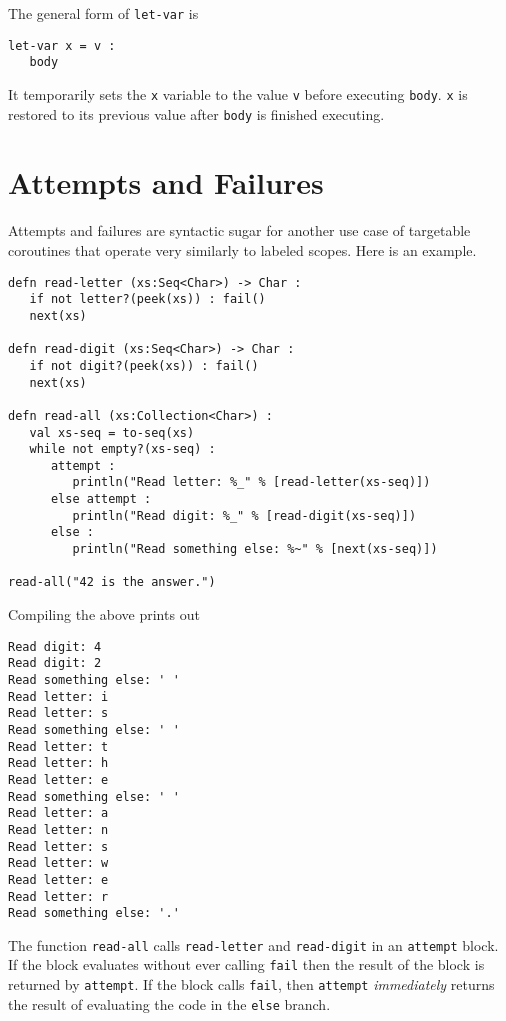\documentclass[10pt,oneside]{book}
\begin{document}
The general form of \texttt{\frenchspacing let-var} is
\begin{lstlisting}
let-var x = v :
   body
\end{lstlisting}
It temporarily sets the \texttt{\frenchspacing x} variable to the value \texttt{\frenchspacing v} before executing \texttt{\frenchspacing body}. \texttt{\frenchspacing x} is restored to its previous value after \texttt{\frenchspacing body} is finished executing.

\section{Attempts and Failures}
Attempts and failures are syntactic sugar for another use case of targetable coroutines that operate very similarly to labeled scopes. Here is an example.
\begin{lstlisting}
defn read-letter (xs:Seq<Char>) -> Char :
   if not letter?(peek(xs)) : fail()
   next(xs)

defn read-digit (xs:Seq<Char>) -> Char :
   if not digit?(peek(xs)) : fail()
   next(xs)

defn read-all (xs:Collection<Char>) :
   val xs-seq = to-seq(xs)
   while not empty?(xs-seq) :
      attempt : 
         println("Read letter: %_" % [read-letter(xs-seq)])
      else attempt :
         println("Read digit: %_" % [read-digit(xs-seq)])
      else :
         println("Read something else: %~" % [next(xs-seq)])

read-all("42 is the answer.")         
\end{lstlisting}
Compiling the above prints out
\begin{lstlisting}
Read digit: 4
Read digit: 2
Read something else: ' '
Read letter: i
Read letter: s
Read something else: ' '
Read letter: t
Read letter: h
Read letter: e
Read something else: ' '
Read letter: a
Read letter: n
Read letter: s
Read letter: w
Read letter: e
Read letter: r
Read something else: '.'
\end{lstlisting}
The function \texttt{\frenchspacing read-all} calls \texttt{\frenchspacing read-letter} and \texttt{\frenchspacing read-digit} in an \texttt{\frenchspacing attempt} block. If the block evaluates without ever calling \texttt{\frenchspacing fail} then the result of the block is returned by \texttt{\frenchspacing attempt}. If the block calls \texttt{\frenchspacing fail}, then \texttt{\frenchspacing attempt} {\em immediately} returns the result of evaluating the code in the \texttt{\frenchspacing else} branch.
\end{document}
